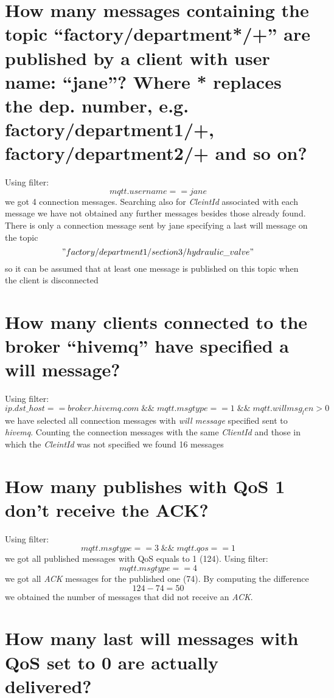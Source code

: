 \documentclass{article}
\begin{document}
\section{How many messages containing the topic
“factory/department*/+” are published by a client with
user name: “jane”? Where * replaces the dep. number,
e.g. factory/department1/+, factory/department2/+
and so on?}
Using filter: \[ mqtt.username == jane\] we got 4 connection messages. Searching also for \textit{CleintId} associated with each message we have not obtained any further messages besides those already found. \hfill \break
There is only a connection message sent by jane specifying a last will message on the topic \[ "factory/department1/section3/hydraulic\_valve" \] so it can be assumed that at least one message is published on this topic when the client is disconnected

\section{How many clients connected to the broker “hivemq”
have specified a will message?}
Using filter: \[ ip.dst\_host == broker.hivemq.com \; \&\& \; mqtt.msgtype == 1 \; \&\& \; mqtt.willmsg_len > 0 \] we have selected
all connection messages with \textit{will message} specified sent to \textit{hivemq}. Counting the connection messages with the same \textit{ClientId} and those in which the \textit{CleintId} was not specified we found 16 messages

\section{How many publishes with QoS 1 don't receive the ACK?}
Using filter: \[ mqtt.msgtype == 3 \; \&\& \; mqtt.qos == 1 \] we got all published messages with QoS equals to 1 (124). \hfill \break
Using filter: \[ mqtt.msgtype == 4 \] we got all \textit{ACK} messages for the published one (74). \hfill \break
By computing the difference \[ 124-74 = 50\] we obtained the number of messages that did not receive an \textit{ACK}.

\section{How many last will messages with QoS set to 0 are
actually delivered?}

\end{document}
